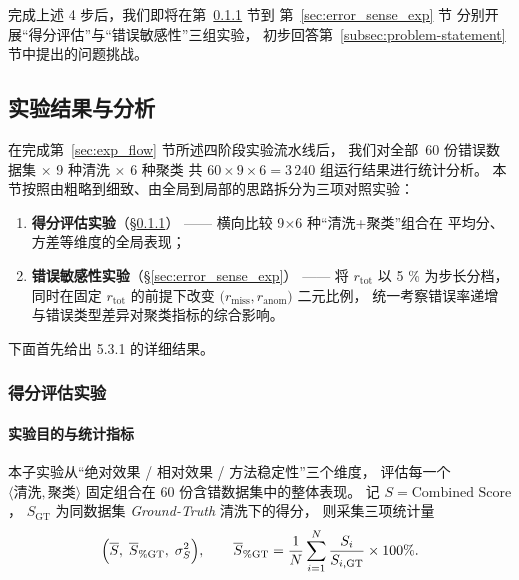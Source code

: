 \documentclass[10pt]{article} %
\numberwithin{equation}{section}
\begin{document}
\noindent
完成上述 4 步后，我们即将在第~\ref{sec:score_eval_exp} 节到
第~\ref{sec:error_sense_exp} 节
分别开展“得分评估”与“错误敏感性”三组实验，
初步回答第~\ref{subsec:problem-statement} 节中提出的问题挑战。

\subsection{\textcolor[rgb]{0.00,0.07,1.00}{实验结果与分析}}
\label{sec:exp_results}

在完成第~\ref{sec:exp_flow} 节所述四阶段实验流水线后，
我们对全部 \(\,60\) 份错误数据集
\(\times\) 9 种清洗 \(\times\) 6 种聚类
共 \(60\times9\times6=3\,240\) 组运行结果进行统计分析。
本节按照由粗略到细致、由全局到局部的思路拆分为三项对照实验：

\begin{enumerate}[leftmargin=2.5em]
  \item \textbf{得分评估实验}（\S\ref{sec:score_eval_exp}）  
        —— 横向比较 9\(\times\)6 种“清洗+聚类”组合在
        平均分、方差等维度的全局表现；
  \item \textbf{错误敏感性实验}（\S\ref{sec:error_sense_exp}）  
        —— 将 \(r_{\text{tot}}\) 以 5 \% 为步长分档，  
        同时在固定 \(r_{\text{tot}}\) 的前提下改变
        \(\bigl(r_{\text{miss}},r_{\text{anom}}\bigr)\) 二元比例，  
        统一考察错误率递增与错误类型差异对聚类指标的综合影响。
\end{enumerate}

下面首先给出 5.3.1 的详细结果。

\subsubsection{\textcolor[rgb]{0.00,0.07,1.00}{得分评估实验}}
\label{sec:score_eval_exp}

\paragraph{实验目的与统计指标}
本子实验从“绝对效果 / 相对效果 / 方法稳定性”三个维度，
评估每一个 \(\langle\!\text{清洗},\text{聚类}\!\rangle\) 固定组合在
60 份含错数据集中的整体表现。
记 \(S=\text{Combined Score}\)，
\(S_{\mathrm{GT}}\) 为同数据集 \textit{Ground-Truth} 清洗下的得分，
则采集三项统计量
\[
  \Bigl(
    \overline{S},\;
    \overline{S}_{\%\mathrm{GT}},\;
    \sigma^{2}_{S}
  \Bigr), \qquad
  \overline{S}_{\%\mathrm{GT}}
    =\frac{1}{N}\sum_{i=1}^{N}\frac{S_i}{S_{i,\mathrm{GT}}}\times100\%.
\]
\end{document}
